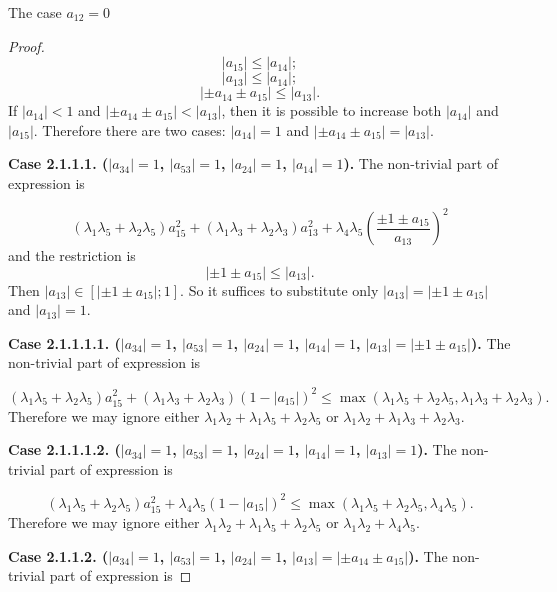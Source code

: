 \documentclass[12pt]{article}
\begin{document}
\begin{section}{The case \texorpdfstring{$a_{12} = 0$}{Lg}}
\begin{proof}
    $$
        |a_{15}|\leq |a_{14}|;
    $$
    $$
        |a_{13}|\leq |a_{14}|;
    $$
    $$
        |\pm a_{14} \pm a_{15}| \leq |a_{13}|.
    $$
    If $|a_{14}|<1$ and $|\pm a_{14} \pm a_{15}| < |a_{13}|$, then it is possible to increase both $|a_{14}|$ and $|a_{15}|$. Therefore there are two cases: $|a_{14}|=1$ and $|\pm a_{14} \pm a_{15}| = |a_{13}|$.

    
    \textbf{Case 2.1.1.1. ($|a_{34}|=1$, $|a_{53}|=1$, $|a_{24}|=1$, $|a_{14}|=1$).} The non-trivial part of expression is 

                $$     
        (\lambda_{1}\lambda_{5} + \lambda_{2}\lambda_{5})a_{15}^2 + (\lambda_{1}\lambda_{3} + \lambda_{2}\lambda_{3})a_{13}^2+\lambda_{4}\lambda_{5}\left(\frac{\pm 1 \pm a_{15}}{a_{13}}\right)^2   $$
        and the restriction is
        $$
            |\pm 1 \pm a_{15}| \leq |a_{13}|.
        $$
        Then $|a_{13}|\in \left[|\pm 1 \pm a_{15}|; 1\right]$. So it suffices to substitute only $|a_{13}|=|\pm 1 \pm a_{15}|$ and $|a_{13}|=1.$

        \textbf{Case 2.1.1.1.1. ($|a_{34}|=1$, $|a_{53}|=1$, $|a_{24}|=1$, $|a_{14}|=1$, $|a_{13}|=|\pm 1 \pm a_{15}|$).} The non-trivial part of expression is 

                $$     
        (\lambda_{1}\lambda_{5} + \lambda_{2}\lambda_{5})a_{15}^2 + (\lambda_{1}\lambda_{3} + \lambda_{2}\lambda_{3})(1-|a_{15}|)^2 \leq \max (\lambda_{1}\lambda_{5} + \lambda_{2}\lambda_{5}, \lambda_{1}\lambda_{3} + \lambda_{2}\lambda_{3}).  $$
        Therefore we may ignore  either $\lambda_{1}\lambda_{2} +\lambda_{1}\lambda_{5} + \lambda_{2}\lambda_{5} $ or $\lambda_{1}\lambda_{2} + \lambda_{1}\lambda_{3} + \lambda_{2}\lambda_{3}$.
        
        \textbf{Case 2.1.1.1.2. ($|a_{34}|=1$, $|a_{53}|=1$, $|a_{24}|=1$, $|a_{14}|=1$, $|a_{13}|=1$).} The non-trivial part of expression is 

                $$     
        (\lambda_{1}\lambda_{5} + \lambda_{2}\lambda_{5})a_{15}^2 + \lambda_{4}\lambda_{5}(1-|a_{15}|)^2 \leq \max (\lambda_{1}\lambda_{5} + \lambda_{2}\lambda_{5}, \lambda_{4}\lambda_{5}).
        $$
    Therefore we may ignore either $\lambda_{1}\lambda_{2} +\lambda_{1}\lambda_{5} + \lambda_{2}\lambda_{5} $ or $\lambda_{1}\lambda_{2} + \lambda_{4}\lambda_{5}$.

       \textbf{Case 2.1.1.2. ($|a_{34}|=1$, $|a_{53}|=1$, $|a_{24}|=1$, $|a_{13}|=|\pm a_{14} \pm a_{15}|$).} The non-trivial part of expression is 


\end{proof}
\end{section}
\end{document}
